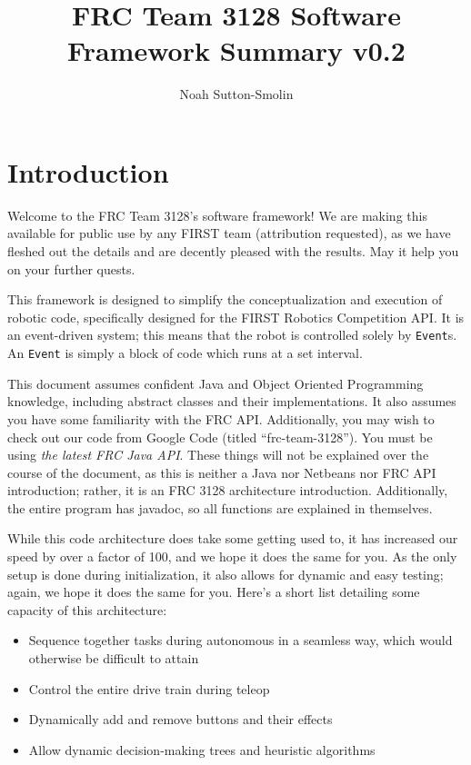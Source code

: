\documentclass[a4paper]{article}
\title{FRC Team 3128 Software Framework Summary v0.2}
\author{Noah Sutton-Smolin}
\begin{document}
\maketitle\tableofcontents\pagebreak

\section{Introduction} Welcome to the FRC Team 3128's software framework! We are making this available for public use by any FIRST team (attribution requested), as we have fleshed out the details and are decently pleased with the results. May it help you on your further quests.

This framework is designed to simplify the conceptualization and execution of robotic code, specifically designed for the FIRST Robotics Competition API. It is an event-driven system; this means that the robot is controlled solely by \lstinline{Event}s. An \lstinline{Event} is simply a block of code which runs at a set interval. 

This document assumes confident Java and Object Oriented Programming knowledge, including abstract classes and their implementations. It also assumes you have some familiarity with the FRC API. Additionally, you may wish to check out our code from Google Code (titled ``frc-team-3128''). You must be using \textit{the latest FRC Java API}. These things will not be explained over the course of the document, as this is neither a Java nor Netbeans nor FRC API introduction; rather, it is an FRC 3128 architecture introduction. Additionally, the entire program has javadoc, so all functions are explained in themselves.

While this code architecture does take some getting used to, it has increased our speed by over a factor of 100, and we hope it does the same for you. As the only setup is done during initialization, it also allows for dynamic and easy testing; again, we hope it does the same for you. Here's a short list detailing some capacity of this architecture:

\begin{itemize}
	\item{Sequence together tasks during autonomous in a seamless way, which would otherwise be difficult to attain}
	\item{Control the entire drive train during teleop}
	\item{Dynamically add and remove buttons and their effects}
	\item{Allow dynamic decision-making trees and heuristic algorithms}
\end{itemize}
\end{document}
